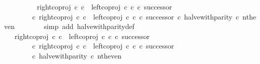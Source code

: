 \begin{isabellebody}
\ \ \ \ \isamarkupfalse%
\ \isamarkupfalse%
\ {\isachardoublequoteopen}{\isachardot}{\kern0pt}{\isachardot}{\kern0pt}{\isachardot}{\kern0pt}\ {\isacharequal}{\kern0pt}\ {\isacharparenleft}{\kern0pt}right{\isacharunderscore}{\kern0pt}coproj\ {\isasymnat}\isactrlsub c\ {\isasymnat}\isactrlsub c\ {\isasymamalg}\ {\isacharparenleft}{\kern0pt}left{\isacharunderscore}{\kern0pt}coproj\ {\isasymnat}\isactrlsub c\ {\isasymnat}\isactrlsub c\ {\isasymcirc}\isactrlsub c\ successor{\isacharparenright}{\kern0pt}{\isacharparenright}{\kern0pt}\isanewline
\ \ \ \ \ \ \ \ {\isasymcirc}\isactrlsub c\ {\isacharparenleft}{\kern0pt}{\isacharparenleft}{\kern0pt}right{\isacharunderscore}{\kern0pt}coproj\ {\isasymnat}\isactrlsub c\ {\isasymnat}\isactrlsub c\ {\isasymamalg}\ {\isacharparenleft}{\kern0pt}left{\isacharunderscore}{\kern0pt}coproj\ {\isasymnat}\isactrlsub c\ {\isasymnat}\isactrlsub c\ {\isasymcirc}\isactrlsub c\ successor{\isacharparenright}{\kern0pt}{\isacharparenright}{\kern0pt}\ {\isasymcirc}\isactrlsub c\ halve{\isacharunderscore}{\kern0pt}with{\isacharunderscore}{\kern0pt}parity{\isacharparenright}{\kern0pt}\ {\isasymcirc}\isactrlsub c\ nth{\isacharunderscore}{\kern0pt}even{\isachardoublequoteclose}\isanewline
\ \ \ \ \ \ \isamarkupfalse%
\ {\isacharparenleft}{\kern0pt}simp\ add{\isacharcolon}{\kern0pt}\ halve{\isacharunderscore}{\kern0pt}with{\isacharunderscore}{\kern0pt}parity{\isacharunderscore}{\kern0pt}def{}{\isacharparenright}{\kern0pt}\isanewline
\ \ \ \ \isamarkupfalse%
\ \isamarkupfalse%
\ {\isachardoublequoteopen}{\isachardot}{\kern0pt}{\isachardot}{\kern0pt}{\isachardot}{\kern0pt}\ {\isacharequal}{\kern0pt}\ {\isacharparenleft}{\kern0pt}{\isacharparenleft}{\kern0pt}right{\isacharunderscore}{\kern0pt}coproj\ {\isasymnat}\isactrlsub c\ {\isasymnat}\isactrlsub c\ {\isasymamalg}\ {\isacharparenleft}{\kern0pt}left{\isacharunderscore}{\kern0pt}coproj\ {\isasymnat}\isactrlsub c\ {\isasymnat}\isactrlsub c\ {\isasymcirc}\isactrlsub c\ successor{\isacharparenright}{\kern0pt}{\isacharparenright}{\kern0pt}\isanewline
\ \ \ \ \ \ \ \ {\isasymcirc}\isactrlsub c\ {\isacharparenleft}{\kern0pt}right{\isacharunderscore}{\kern0pt}coproj\ {\isasymnat}\isactrlsub c\ {\isasymnat}\isactrlsub c\ {\isasymamalg}\ {\isacharparenleft}{\kern0pt}left{\isacharunderscore}{\kern0pt}coproj\ {\isasymnat}\isactrlsub c\ {\isasymnat}\isactrlsub c\ {\isasymcirc}\isactrlsub c\ successor{\isacharparenright}{\kern0pt}{\isacharparenright}{\kern0pt}{\isacharparenright}{\kern0pt}\isanewline
\ \ \ \ \ \ \ \ {\isasymcirc}\isactrlsub c\ halve{\isacharunderscore}{\kern0pt}with{\isacharunderscore}{\kern0pt}parity\ {\isasymcirc}\isactrlsub c\ nth{\isacharunderscore}{\kern0pt}even{\isachardoublequoteclose}\isanewline

\end{isabellebody}
